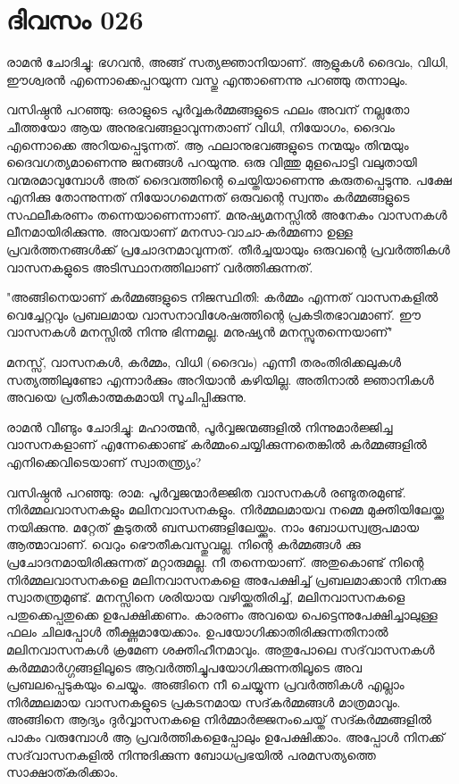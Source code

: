 \newpage
\section{ദിവസം 026}


രാമന്‍ ചോദിച്ചു: ഭഗവന്‍, അങ്ങ്‌ സത്യജ്ഞാനിയാണ്‌. ആളുകള്‍ ദൈവം, വിധി, ഈശ്വരന്‍ എന്നൊക്കെപ്പറയുന്ന വസ്തു എന്താണെന്നു പറഞ്ഞു തന്നാലും.

വസിഷ്ഠന്‍ പറഞ്ഞു: ഒരാളുടെ പൂര്‍വ്വകര്‍മ്മങ്ങളുടെ ഫലം അവന്‌ നല്ലതോ ചീത്തയോ ആയ അനുഭവങ്ങളാവുന്നതാണ്‌ വിധി, നിയോഗം, ദൈവം എന്നൊക്കെ അറിയപ്പെടുന്നത്‌. ആ ഫലാനുഭവങ്ങളുടെ നന്മയും തിന്മയും ദൈവഗത്യമാണെന്നു ജനങ്ങള്‍ പറയുന്നു. ഒരു വിത്തു മുളപൊട്ടി വലുതായി വന്മരമാവുമ്പോള്‍ അത്‌ ദൈവത്തിന്റെ ചെയ്തിയാണെന്നു കരുതപ്പെടുന്നു. പക്ഷേ എനിക്കു തോന്നുന്നത്‌ നിയോഗമെന്നത്‌ ഒരുവന്റെ സ്വന്തം കര്‍മ്മങ്ങളുടെ സഫലീകരണം തന്നെയാണെന്നാണ്‌. മനുഷ്യമനസ്സില്‍ അനേകം വാസനകള്‍ ലീനമായിരിക്കുന്നു. അവയാണ്‌ മനസാ-വാചാ-കര്‍മ്മണാ ഉള്ള പ്രവര്‍ത്തനങ്ങള്‍ക്ക്‌ പ്രചോദനമാവുന്നത്‌. തീര്‍ച്ചയായും ഒരുവന്റെ പ്രവര്‍ത്തികള്‍ വാസനകളുടെ അടിസ്ഥാനത്തിലാണ്‌ വര്‍ത്തിക്കുന്നത്‌.

"അങ്ങിനെയാണ്‌ കര്‍മ്മങ്ങളുടെ നിജസ്ഥിതി: കര്‍മ്മം എന്നത്‌ വാസനകളില്‍ വെച്ചേറ്റവും പ്രബലമായ വാസനാവിശേഷത്തിന്റെ പ്രകടിതഭാവമാണ്‌. ഈ വാസനകള്‍ മനസ്സില്‍ നിന്നു ഭിന്നമല്ല. മനുഷ്യന്‍ മനസ്സുതന്നെയാണ്‌" 

മനസ്സ്‌, വാസനകള്‍, കര്‍മ്മം, വിധി (ദൈവം) എന്നീ തരംതിരിക്കലുകള്‍ സത്യത്തിലുണ്ടോ എന്നാര്‍ക്കും അറിയാന്‍ കഴിയില്ല. അതിനാല്‍ ജ്ഞാനികള്‍ അവയെ പ്രതീകാത്മകമായി സൂചിപ്പിക്കുന്നു. 

രാമന്‍ വീണ്ടും ചോദിച്ചു: മഹാത്മന്‍, പൂര്‍വ്വജന്മങ്ങളില്‍ നിന്നുമാര്‍ജ്ജിച്ച വാസനകളാണ്‌ എന്നേക്കൊണ്ട്‌ കര്‍മ്മംചെയ്യിക്കുന്നതെങ്കില്‍ കര്‍മ്മങ്ങളില്‍ എനിക്കെവിടെയാണ്‌ സ്വാതന്ത്ര്യം?

വസിഷ്ഠന്‍ പറഞ്ഞു: രാമ: പൂര്‍വ്വജന്മാര്‍ജ്ജിത വാസനകള്‍ രണ്ടുതരമുണ്ട്‌. നിര്‍മ്മലവാസനകളും മലിനവാസനകളും. നിര്‍മ്മലമായവ നമ്മെ മുക്തിയിലേയ്ക്കു നയിക്കുന്നു. മറ്റേത്‌ കൂടുതല്‍ ബന്ധനങ്ങളിലേയ്ക്കും. നാം ബോധസ്വരൂപമായ ആത്മാവാണ്‌. വെറും ഭൌതീകവസ്തുവല്ല. നിന്റെ കര്‍മ്മങ്ങള്‍ ക്കു പ്രചോദനമായിരിക്കുന്നത്‌ മറ്റാരുമല്ല. നീ തന്നെയാണ്‌. അതുകൊണ്ട്‌ നിന്റെ നിര്‍മ്മലവാസനകളെ മലിനവാസനകളെ അപേക്ഷിച്ച്‌ പ്രബലമാക്കാന്‍ നിനക്കു സ്വാതന്ത്രമുണ്ട്‌. മനസ്സിനെ ശരിയായ വഴിയ്ക്കുതിരിച്ച്‌, മലിനവാസനകളെ പതുക്കെപ്പതുക്കെ ഉപേക്ഷിക്കണം. കാരണം അവയെ പെട്ടെന്നുപേക്ഷിച്ചാലുള്ള ഫലം ചിലപ്പോള്‍ തീക്ഷ്ണമായേക്കാം. ഉപയോഗിക്കാതിരിക്കുന്നതിനാല്‍ മലിനവാസനകള്‍ ക്രമേണ ശക്തിഹീനമാവും. അതുപോലെ സദ്‌വാസനകള്‍ കര്‍മ്മമാര്‍ഗ്ഗങ്ങളിലൂടെ ആവര്‍ത്തിച്ചുപയോഗിക്കുന്നതിലൂടെ അവ പ്രബലപ്പെടുകയും ചെയ്യും. അങ്ങിനെ നീ ചെയ്യുന്ന പ്രവര്‍ത്തികള്‍ എല്ലാം നിര്‍മ്മലമായ വാസനകളുടെ പ്രകടനമായ സദ്‌കര്‍മ്മങ്ങള്‍ മാത്രമാവും. അങ്ങിനെ ആദ്യം ദുര്‍വ്വാസനകളെ നിര്‍മ്മാര്‍ജ്ജനംചെയ്ത്‌ സദ്കര്‍മ്മങ്ങളില്‍ പാകം വരുമ്പോള്‍ ആ പ്രവര്‍ത്തികളെപ്പോലും ഉപേക്ഷിക്കാം. അപ്പോള്‍ നിനക്ക്‌ സദ്‌വാസനകളില്‍ നിന്നുദിക്കുന്ന ബോധപ്രഭയില്‍ പരമസത്യത്തെ സാക്ഷാത്കരിക്കാം.
